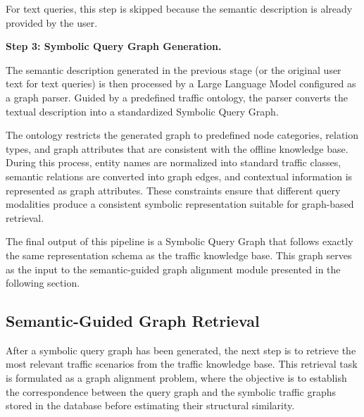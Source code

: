 \documentclass[a4paper, 11pt]{article} %
\begin{document}
For text queries, this step is skipped because the semantic description is already provided by the user.

\vspace{0.5em}

\textbf{Step 3: Symbolic Query Graph Generation.}

The semantic description generated in the previous stage (or the original user text for text queries) is then processed by a Large Language Model configured as a graph parser. Guided by a predefined traffic ontology, the parser converts the textual description into a standardized Symbolic Query Graph.

The ontology restricts the generated graph to predefined node categories, relation types, and graph attributes that are consistent with the offline knowledge base. During this process, entity names are normalized into standard traffic classes, semantic relations are converted into graph edges, and contextual information is represented as graph attributes. These constraints ensure that different query modalities produce a consistent symbolic representation suitable for graph-based retrieval.

The final output of this pipeline is a Symbolic Query Graph that follows exactly the same representation schema as the traffic knowledge base. This graph serves as the input to the semantic-guided graph alignment module presented in the following section.

\subsection{Semantic-Guided Graph Retrieval}

After a symbolic query graph has been generated, the next step is to retrieve the most relevant traffic scenarios from the traffic knowledge base. This retrieval task is formulated as a graph alignment problem, where the objective is to establish the correspondence between the query graph and the symbolic traffic graphs stored in the database before estimating their structural similarity.
\end{document}

